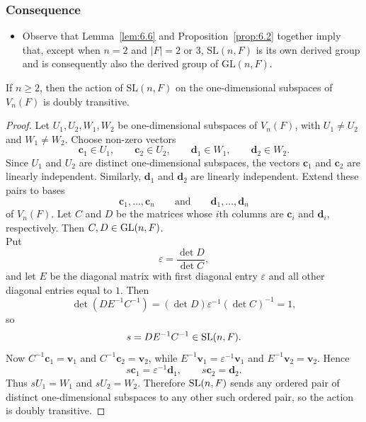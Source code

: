 \documentclass[../Odyssey_Project.tex]{subfiles}
\begin{document}
\subsubsection*{Consequence}
\begin{itemize}
    \item Observe that Lemma~\ref{lem:6.6} and Proposition~\ref{prop:6.2} together imply that, except when $n = 2$ and $|F| = 2$ or $3$, $\mathrm{SL}(n,F)$ is its own derived group and is consequently also the derived group of $\mathrm{GL}(n,F)$.
\end{itemize}

\begin{lemma}
\label{lem:6.7}
If $n \geq 2$, then the action of $\mathrm{SL}(n,F)$ on the one-dimensional subspaces of $V_n(F)$ is doubly transitive.
\end{lemma}
\begin{proof}
Let $U_1,U_2,W_1,W_2$ be one-dimensional subspaces of $V_n(F)$, with $U_1\neq U_2$ and $W_1\neq W_2$. Choose non-zero vectors
\[
    \mathbf{c}_1\in U_1,\qquad \mathbf{c}_2\in U_2,\qquad
    \mathbf{d}_1\in W_1,\qquad \mathbf{d}_2\in W_2.
\]
Since $U_1$ and $U_2$ are distinct one-dimensional subspaces, the vectors $\mathbf{c}_1$ and $\mathbf{c}_2$ are linearly independent. Similarly, $\mathbf{d}_1$ and $\mathbf{d}_2$ are linearly independent. Extend these pairs to bases
\[
    \mathbf{c}_1,\ldots,\mathbf{c}_n
    \qquad\text{and}\qquad
    \mathbf{d}_1,\ldots,\mathbf{d}_n
\]
of $V_n(F)$. Let $C$ and $D$ be the matrices whose $i$th columns are $\mathbf{c}_i$ and $\mathbf{d}_i$, respectively. Then $C,D\in \operatorname{GL}(n,F)$.\\
Put
\[
    \varepsilon=\frac{\det D}{\det C},
\]
and let $E$ be the diagonal matrix with first diagonal entry $\varepsilon$ and all other diagonal entries equal to $1$. Then
\[
    \det(DE^{-1}C^{-1})
    =(\det D)\varepsilon^{-1}(\det C)^{-1}
    =1,
\]
so
\[
    s=DE^{-1}C^{-1}\in \operatorname{SL}(n,F).
\]
Now $C^{-1}\mathbf{c}_1=\mathbf{v}_1$ and $C^{-1}\mathbf{c}_2=\mathbf{v}_2$, while $E^{-1}\mathbf{v}_1=\varepsilon^{-1}\mathbf{v}_1$ and $E^{-1}\mathbf{v}_2=\mathbf{v}_2$. Hence
\[
    s\mathbf{c}_1=\varepsilon^{-1}\mathbf{d}_1,
    \qquad
    s\mathbf{c}_2=\mathbf{d}_2.
\]
Thus $sU_1=W_1$ and $sU_2=W_2$. Therefore $\operatorname{SL}(n,F)$ sends any ordered pair of distinct one-dimensional subspaces to any other such ordered pair, so the action is doubly transitive.
\end{proof}
\end{document}
